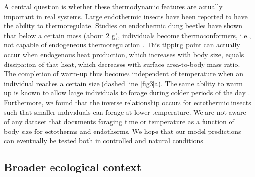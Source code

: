 A central question is whether these thermodynamic features are actually important in real systems.
Large endothermic insects have been reported to have the ability to thermoregulate.
Studies on endothermic dung beetles have shown that below a certain mass (about 2 g), individuals become thermoconformers, i.e., not capable of endogeneous thermoregulation \citep{Bartholomew1978, Verdu2006}.
This tipping point can actually occur when endogenous heat production, which increases with body size, equals dissipation of that heat, which decreases with surface area-to-body mass ratio.
The completion of warm-up thus becomes independent of temperature when an individual reaches a certain size (dashed line \cref{fig3}a).
The same ability to warm up is known to allow large individuals to forage during colder periods of the day \citep{May1985}.
Furthermore, we found that the inverse relationship occurs for ectothermic insects such that smaller individuals can forage at lower temperature.
We are not aware of any dataset that documents foraging time or temperature as a function of body size for ectotherms and endotherms.
We hope that our model predictions can eventually be tested both in controlled and natural conditions.

\subsection*{Broader ecological context}

